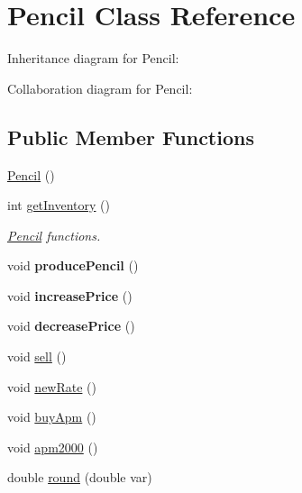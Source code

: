 \hypertarget{classPencil}{}\section{Pencil Class Reference}
\label{classPencil}


Inheritance diagram for Pencil\+:


Collaboration diagram for Pencil\+:
\subsection*{Public Member Functions}
\begin{DoxyCompactItemize}
\item 
\hyperlink{classPencil_a0dbfad3eebde26e9d5dacace449d9e14}{Pencil} ()
\item 
\mbox{\label{classPencil_aa629f185016565c847bb0a401634f0e5}} 
int \hyperlink{classPencil_aa629f185016565c847bb0a401634f0e5}{get\+Inventory} ()
\begin{DoxyCompactList}\small\item\em \hyperlink{classPencil}{Pencil} functions. \end{DoxyCompactList}\item 
\mbox{\label{classPencil_ae966b635fd81f8d346aaa7f8f782f143}} 
void {\bfseries produce\+Pencil} ()
\item 
\mbox{\label{classPencil_a075683b2e85f8819e71f365c097e5f61}} 
void {\bfseries increase\+Price} ()
\item 
\mbox{\label{classPencil_a84aeeb98b1caa424d92c312e56e42797}} 
void {\bfseries decrease\+Price} ()
\item 
void \hyperlink{classPencil_a2731dadbd64edeee0a1cc773a79eee24}{sell} ()
\item 
void \hyperlink{classPencil_a759af90fe58f6399e831f2c53c0470bd}{new\+Rate} ()
\item 
void \hyperlink{classPencil_a506c7c9587a026f1238e880b1b103c2f}{buy\+Apm} ()
\item 
void \hyperlink{classPencil_ad1f8942401865e05d2a220f64a309f3e}{apm2000} ()
\item 
double \hyperlink{classPencil_a9bbb66405447f4cc218ecbd1a09b7c3b}{round} (double var)
\end{DoxyCompactItemize}
